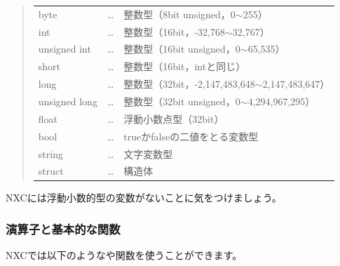 \documentclass[11pt]{jarticle}
\makeatletter
\def\nmindex{\@ifnextchar[{\@nmindex}{\@@nmindex}}
\def\@nmindex[#1]#2{#2\index{#1@#2}}
\def\@@nmindex#1{#1\index{#1}}
\makeatother
\begin{document}
\begin{quote}
  \begin{tabular}{lcr}
    \multicolumn{1}{l}{byte} & \dots & \multicolumn{1}{l}{整数型（8bit unsigned，0$\sim$255）} \\
    \multicolumn{1}{l}{int} & \dots & \multicolumn{1}{l}{整数型（16bit，-32,768$\sim$32,767）} \\
    \multicolumn{1}{l}{unsigned int} & \dots & \multicolumn{1}{l}{整数型（16bit unsigned，0$\sim$65,535）} \\
    \multicolumn{1}{l}{short} & \dots    &  \multicolumn{1}{l}{整数型（16bit，intと同じ）} \\
    \multicolumn{1}{l}{long} & \dots    &  \multicolumn{1}{l}{整数型（32bit，-2,147,483,648$\sim$2,147,483,647）} \\
    \multicolumn{1}{l}{unsigned long} & \dots & \multicolumn{1}{l}{整数型（32bit unsigned，0$\sim$4,294,967,295）} \\
    \multicolumn{1}{l}{float} & \dots    &  \multicolumn{1}{l}{浮動小数点型（32bit）} \\
    \multicolumn{1}{l}{bool} &  \dots       &  \multicolumn{1}{l}{trueかfalseの二値をとる変数型} \\
    \multicolumn{1}{l}{string} & \dots      &  \multicolumn{1}{l}{文字変数型}  \\
   \multicolumn{1}{l}{struct} & \dots & \multicolumn{1}{l}{構造体}
\end{tabular}
\end{quote}

NXCには浮動小数的型の変数がないことに気をつけましょう。

\subsubsection{演算子と基本的な関数}

NXCでは以下のような\nmindex[えんざんし]{演算子}や関数を使うことができます。
\end{document}
